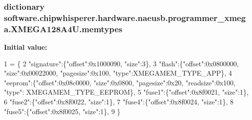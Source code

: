 \subsubsection[{memtypes}]{\setlength{\rightskip}{0pt plus 5cm}dictionary software.\+chipwhisperer.\+hardware.\+naeusb.\+programmer\+\_\+xmega.\+X\+M\+E\+G\+A128\+A4\+U.\+memtypes\hspace{0.3cm}{\ttfamily [static]}}\label{classsoftware_1_1chipwhisperer_1_1hardware_1_1naeusb_1_1programmer__xmega_1_1XMEGA128A4U_a9ad0d9c9ce317da7ee43bb0923d0da40}
{\bfseries Initial value\+:}
\begin{DoxyCode}
1 = \{
2        \textcolor{stringliteral}{"signature"}:\{\textcolor{stringliteral}{"offset"}:0x1000090, \textcolor{stringliteral}{"size"}:3\},
3        \textcolor{stringliteral}{"flash"}:\{\textcolor{stringliteral}{"offset"}:0x0800000, \textcolor{stringliteral}{"size"}:0x00022000, \textcolor{stringliteral}{"pagesize"}:0x100, \textcolor{stringliteral}{"type"}:XMEGAMEM\_TYPE\_APP\},
4        \textcolor{stringliteral}{"eeprom"}:\{\textcolor{stringliteral}{"offset"}:0x08c0000, \textcolor{stringliteral}{"size"}:0x0800, \textcolor{stringliteral}{"pagesize"}:0x20, \textcolor{stringliteral}{"readsize"}:0x100, \textcolor{stringliteral}{"type"}:
      XMEGAMEM\_TYPE\_EEPROM\},
5        \textcolor{stringliteral}{"fuse1"}:\{\textcolor{stringliteral}{"offset"}:0x8f0021, \textcolor{stringliteral}{"size"}:1\},
6        \textcolor{stringliteral}{"fuse2"}:\{\textcolor{stringliteral}{"offset"}:0x8f0022, \textcolor{stringliteral}{"size"}:1\},
7        \textcolor{stringliteral}{"fuse4"}:\{\textcolor{stringliteral}{"offset"}:0x8f0024, \textcolor{stringliteral}{"size"}:1\},
8        \textcolor{stringliteral}{"fuse5"}:\{\textcolor{stringliteral}{"offset"}:0x8f0025, \textcolor{stringliteral}{"size"}:1\},
9      \}
\end{DoxyCode}
\hypertarget{classsoftware_1_1chipwhisperer_1_1hardware_1_1naeusb_1_1programmer__xmega_1_1XMEGA128A4U_ad7fc3995fadd4dbd8f0baefef13994b7}{}
